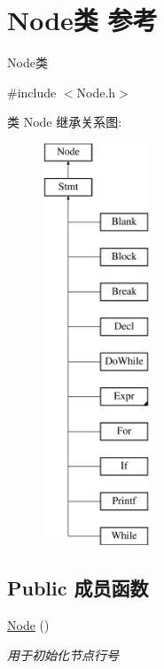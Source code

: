 \hypertarget{class_node}{}\section{Node类 参考}
\label{class_node}


Node类  




{\ttfamily \#include $<$Node.\+h$>$}

类 Node 继承关系图\+:\begin{figure}[H]
\begin{center}
\leavevmode
\includegraphics[height=12.000000cm]{class_node}
\end{center}
\end{figure}
\subsection*{Public 成员函数}
\begin{DoxyCompactItemize}
\item 
\hyperlink{class_node_ad7a34779cad45d997bfd6d3d8043c75f}{Node} ()\hypertarget{class_node_ad7a34779cad45d997bfd6d3d8043c75f}{}\label{class_node_ad7a34779cad45d997bfd6d3d8043c75f}

\begin{DoxyCompactList}\small\item\em 用于初始化节点行号 \end{DoxyCompactList}\end{DoxyCompactItemize}

